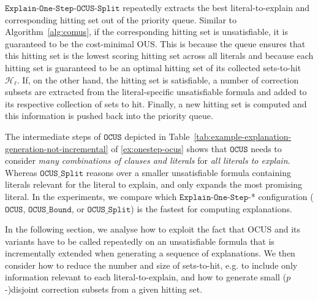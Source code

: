 \documentclass[twoside,11pt]{article}
\newcommand\m[1]{\mathcal{#1}}
\newcommand\comment[1]{\marginpar{\tiny #1}}
\renewcommand\comment[1]{#1}
\newcommand{\newtext}[1]{{\comment{{\color{blue} #1}}}}
\newcommand\setstohit{\ensuremath{\m{H} }\xspace}
\newcommand\mm[1]{\ensuremath{#1}\xspace}
\newcommand\call[1]{\mm{\texttt{#1}}}
\newcommand\comus{\mm{\call{OCUS}}}
\newcommand{\comusbound}{\mm{\call{OCUS\_Bound}}}
\newcommand{\comussplit}{\mm{\call{OCUS\_Split}}}
\newcommand\onestep{\ensuremath{\call{Explain-One-Step}}\xspace}
\newcommand\iterativeonestep{\ensuremath{\call{Explain-One-Step-OCUS-Split}}\xspace}
\begin{document}
\iterativeonestep repeatedly extracts the best literal-to-explain and corresponding hitting set out of the priority queue. Similar to Algorithm~\ref{alg:comus}, if the corresponding hitting set is unsatisfiable, it is guaranteed to be the cost-minimal OUS. 
This is because the queue ensures that this hitting set is the lowest scoring hitting set across all literals and because each hitting set is guaranteed to be an optimal hitting set of its collected sets-to-hit $\setstohit_\ell$. 
If, on the other hand, the hitting set is satisfiable, a number of correction subsets are extracted from the literal-specific unsatisfiable formula and added to its respective collection of sets to hit. 
Finally, a new hitting set is computed and this information is pushed back into the priority queue. 

	The intermediate steps of \comus depicted in Table~\ref{tab:example-explanation-generation-not-incremental} of \cref{ex:onestep-ocus} shows that \comus needs to consider \emph{many combinations of clauses and literals} for \emph{all literals to explain}. 
	Whereas \comussplit reasons over a smaller unsatisfiable formula containing literals relevant for the literal to explain, and only expands the most promising literal.
	In the experiments, we compare which \onestep-* configuration  (\comus, \comusbound, or \comussplit) is the fastest for computing explanations.

 	In the following section, we analyse how to exploit the fact that OCUS and its variants have to be called repeatedly on an unsatisfiable formula that is incrementally extended when generating a sequence of explanations.
	We then consider how to reduce the number and size of sets-to-hit, e.g. to include only information relevant to each literal-to-explain, and how to generate small ($p$-)disjoint correction subsets from a given hitting set.
 	
\end{document}
